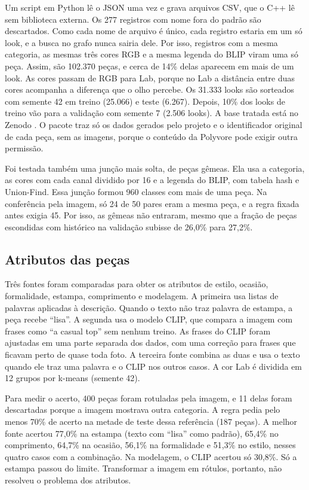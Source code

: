 \documentclass[conference]{IEEEtran}
\begin{document}
Um script em Python lê o JSON uma vez e grava arquivos CSV, que o C++ lê sem biblioteca externa. Os 277 registros com nome fora do padrão são descartados. Como cada nome de arquivo é único, cada registro estaria em um só look, e a busca no grafo nunca sairia dele. Por isso, registros com a mesma categoria, as mesmas três cores RGB e a mesma legenda do BLIP viram uma só peça. Assim, são 102.370 peças, e cerca de 14\% delas aparecem em mais de um look. As cores passam de RGB para Lab, porque no Lab a distância entre duas cores acompanha a diferença que o olho percebe. Os 31.333 looks são sorteados com semente 42 em treino (25.066) e teste (6.267). Depois, 10\% dos looks de treino vão para a validação com semente 7 (2.506 looks). A base tratada está no Zenodo \cite{zenodo}. O pacote traz só os dados gerados pelo projeto e o identificador original de cada peça, sem as imagens, porque o conteúdo da Polyvore pode exigir outra permissão.

Foi testada também uma junção mais solta, de peças gêmeas. Ela usa a categoria, as cores com cada canal dividido por 16 e a legenda do BLIP, com tabela hash e Union-Find. Essa junção formou 960 classes com mais de uma peça. Na conferência pela imagem, só 24 de 50 pares eram a mesma peça, e a regra fixada antes exigia 45. Por isso, as gêmeas não entraram, mesmo que a fração de peças escondidas com histórico na validação subisse de 26,0\% para 27,2\%.

\subsection{Atributos das peças}

Três fontes foram comparadas para obter os atributos de estilo, ocasião, formalidade, estampa, comprimento e modelagem. A primeira usa listas de palavras aplicadas à descrição. Quando o texto não traz palavra de estampa, a peça recebe ``lisa''. A segunda usa o modelo CLIP, que compara a imagem com frases como ``a casual top'' sem nenhum treino. As frases do CLIP foram ajustadas em uma parte separada dos dados, com uma correção para frases que ficavam perto de quase toda foto. A terceira fonte combina as duas e usa o texto quando ele traz uma palavra e o CLIP nos outros casos. A cor Lab é dividida em 12 grupos por k-means (semente 42).

Para medir o acerto, 400 peças foram rotuladas pela imagem, e 11 delas foram descartadas porque a imagem mostrava outra categoria. A regra pedia pelo menos 70\% de acerto na metade de teste dessa referência (187 peças). A melhor fonte acertou 77,0\% na estampa (texto com ``lisa'' como padrão), 65,4\% no comprimento, 64,7\% na ocasião, 56,1\% na formalidade e 51,3\% no estilo, nesses quatro casos com a combinação. Na modelagem, o CLIP acertou só 30,8\%. Só a estampa passou do limite. Transformar a imagem em rótulos, portanto, não resolveu o problema dos atributos.
\end{document}
